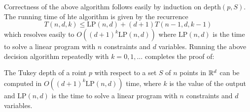 \documentclass[charterfonts,lotsofwhite]{patmorin}
\newcommand{\td}{\mathrm{depth}}
\newcommand{\lp}{\mathrm{LP}}
\begin{document}
Correctness of the above algorithm follows easily by induction on
$\td(p,S)$.  The running time of hte algorithm is given by the
recurrence
\[
  T(n,d,k) \le \lp(n,d) + (d+1) T(n-1,d,k-1)
\]
which resolves easily to $O((d+1)^k\lp(n,d))$ where $\lp(n,d)$ is the
time to solve a linear program with $n$ constraints and $d$ variables.
Running the above decision algorithm repeatedly with $k=0,1,\ldots$
completes the proof of:

\begin{thm}
The Tukey depth of a roint $p$ with respect to a set $S$ of $n$ points
in $\mathbb{R}^d$ can be computed in $O((d+1)^k\lp(n,d))$ time, where
$k$ is the value of the output and $\lp(n,d)$ is the time to solve a
linear program with $n$ constraints and $d$ variables.
\end{thm}
\end{document}
